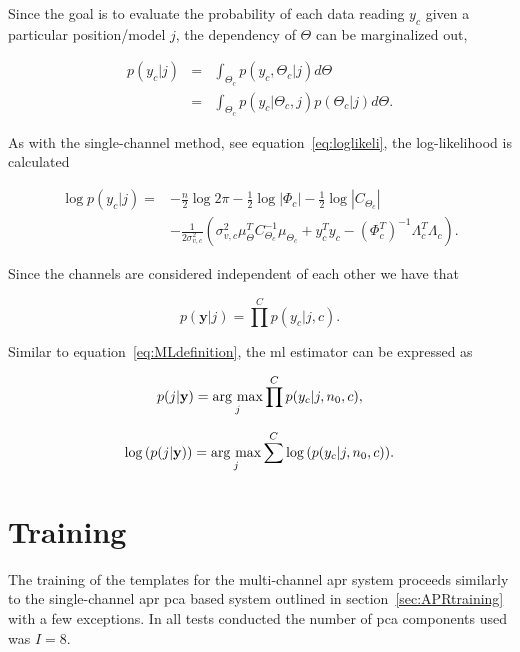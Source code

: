 Since the goal is to evaluate the probability of each data reading $y_c$ given a particular position/model $j$, the dependency of $\Theta$ can be marginalized out,

\begin{eqnarray}\nonumber
p(y_c|j) &=& \int_{\Theta_c} p(y_c,\Theta_c|j) d\Theta \\
\label{eq:marg1_c} &=& \int_{\Theta_c} p(y_c|\Theta_c,j)p(\Theta_c|j) d\Theta.
\end{eqnarray}

As with the single-channel method, see equation~\ref{eq:loglikeli}, the log-likelihood is calculated

\begin{equation}\label{eq:loglikeli_c}\begin{split}
\log{p(y_c|j)} = &- \frac{n}{2}\log{2 \pi}- \frac{1}{2}\log{|\Phi_c|} - \frac{1}{2}\log{|C_{\Theta_c}|} \\
& -\frac{1}{2\sigma^2_{v,c}}\left(\sigma_{v,c}^2\mu_\Theta^TC_{\Theta_c}^{-1}\mu_{\Theta_c} + y_c^Ty_c- \left(\Phi_c^T\right)^{-1}\Lambda_c^T\Lambda_c\right).
\end{split}\end{equation}

Since the channels are considered independent of each other we have that

\begin{equation}\label{eq:jointprob_c}
p(\textbf{y} | j) = \prod^C p(y_c | j, c).
\end{equation}

Similar to equation~\ref{eq:MLdefinition}, the \DIFdelbegin {}\DIFdelend \DIFaddbegin \gls{ml} \DIFaddend estimator can be expressed as

\begin{equation}\label{eq:MLdefinition_c}
p(j |\textbf{y}) = \underset{j}{\mathrm{arg~max}} \prod^C p(y_c|j,n_0,c),
\end{equation}

\begin{equation}\label{eq:MLdefinition2_c}
\log{\left( p(j |\textbf{y})\right)} = \underset{j}{\mathrm{arg~max}} \sum^C \log{\left( p(y_c|j,n_0,c) \right)}.
\end{equation}

\section{Training}\label{sec:MultiAPRTraining}
The training of the templates for the multi-channel \DIFdelbegin {}\DIFdelend \DIFaddbegin \gls{apr} \DIFaddend system proceeds similarly to the single-channel \DIFdelbegin {}\DIFdelend \DIFaddbegin \gls{apr} \gls{pca} \DIFaddend based system outlined in section~\ref{sec:APRtraining} with a few exceptions. In all tests conducted the number of \DIFdelbegin {}\DIFdelend \DIFaddbegin \gls{pca} \DIFaddend components used was $I = 8$.

